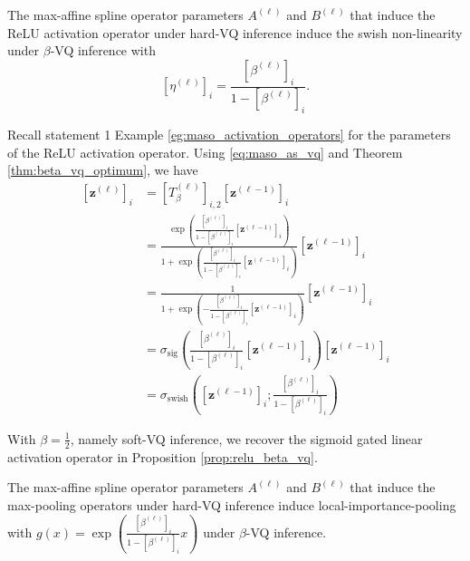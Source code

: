 \begin{proposition}\label{prop:relu_beta_vq}
    The max-affine spline operator parameters $A^{(\ell)}$ and $B^{(\ell)}$ that induce the ReLU activation operator under hard-VQ inference induce the swish non-linearity under $\beta$-VQ inference with $$\left[\eta^{(\ell)}\right]_i=\frac{\left[\beta^{(\ell)}\right]_i}{1-\left[\beta^{(\ell)}\right]_i}.$$
\end{proposition}

\begin{tproof}
    Recall statement 1 Example \ref{eg:maso_activation_operators} for the parameters of the ReLU activation operator. Using \eqref{eq:maso_as_vq} and Theorem \ref{thm:beta_vq_optimum}, we have
    \begin{align*}
        \left[\mathbf{z}^{(\ell)}\right]_i&=\left[T_{\beta}^{(\ell)}\right]_{i,2}\left[\mathbf{z}^{(\ell-1)}\right]_i\\&=\frac{\exp\left(\frac{\left[\beta^{(\ell)}\right]_i}{1-\left[\beta^{(\ell)}\right]_i}\left[\mathbf{z}^{(\ell-1)}\right]_i\right)}{1+\exp\left(\frac{\left[\beta^{(\ell)}\right]_i}{1-\left[\beta^{(\ell)}\right]_i}\left[\mathbf{z}^{(\ell-1)}\right]_i\right)}\left[\mathbf{z}^{(\ell-1)}\right]_i\\&=\frac{1}{1+\exp\left(-\frac{\left[\beta^{(\ell)}\right]_i}{1-\left[\beta^{(\ell)}\right]_i}\left[\mathbf{z}^{(\ell-1)}\right]_i\right)}\left[\mathbf{z}^{(\ell-1)}\right]_i\\&=\sigma_{\text{sig}}\left(\frac{\left[\beta^{(\ell)}\right]_i}{1-\left[\beta^{(\ell)}\right]_i}\left[\mathbf{z}^{(\ell-1)}\right]_i\right)\left[\mathbf{z}^{(\ell-1)}\right]_i\\&=\sigma_{\text{swish}}\left(\left[\mathbf{z}^{(\ell-1)}\right]_i;\frac{\left[\beta^{(\ell)}\right]_i}{1-\left[\beta^{(\ell)}\right]_i}\right)
    \end{align*}
\end{tproof}

\begin{remark}
    With $\beta=\frac{1}{2}$, namely soft-VQ inference, we recover the sigmoid gated linear activation operator in Proposition \ref{prop:relu_beta_vq}.
\end{remark}

\begin{proposition}\label{prop:maxpooling_beta_vq}
    The max-affine spline operator parameters $A^{(\ell)}$ and $B^{(\ell)}$ that induce the max-pooling operators under hard-VQ inference induce local-importance-pooling with $g(x)=\exp\left(\frac{\left[\beta^{(\ell)}\right]_i}{1-\left[\beta^{(\ell)}\right]_i}x\right)$ under $\beta$-VQ inference.
\end{proposition}

